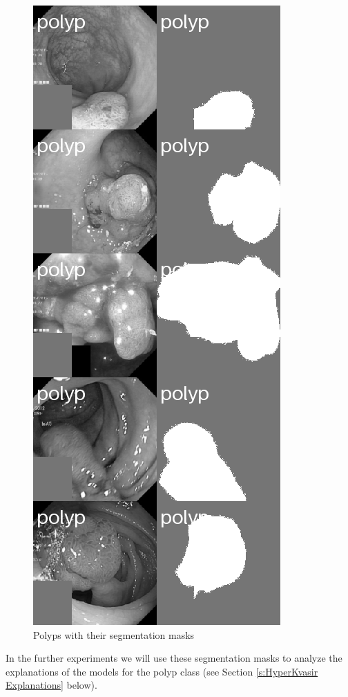 \documentclass[magisterska,en]{pracamgr}
\begin{document}
\begin{figure}[H]
\centering
\includegraphics[scale=0.5]{./images/polyps_segmentation.png}
\caption{Polyps with their segmentation masks}
\end{figure}

In the further experiments we will use these segmentation masks to analyze the explanations of the models for the polyp class (see Section \ref{s:HyperKvasir Explanations} below).
\end{document}

